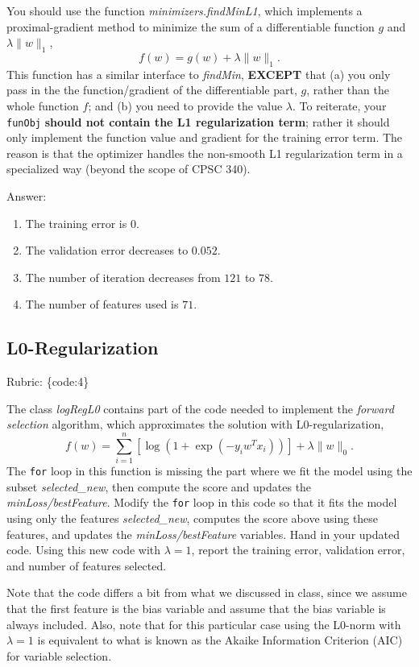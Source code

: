 \documentclass{article}
\def\rubric#1{\gre{Rubric: \{#1\}}}{}
\def\blu#1{{\color{blu}#1}}
\def\gre#1{{\color{gre}#1}}
\def\norm#1{\|#1\|}
\begin{document}
You should use the function \emph{minimizers.findMinL1}, which implements a
proximal-gradient method to minimize the sum of a differentiable function $g$ and $\lambda\norm{w}_1$,
\[
f(w) = g(w) + \lambda \norm{w}_1.
\]
This function has a similar interface to \emph{findMin}, \textbf{EXCEPT} that (a) you
only pass in the the function/gradient of the differentiable
part, $g$, rather than the whole function $f$; and (b) you need to provide the value $\lambda$.
To reiterate, your \texttt{funObj} \textbf{should not contain the L1 regularization term}; rather it
should only implement the function value and gradient for the training error term. The reason is that
the optimizer handles the non-smooth L1 regularization term in a specialized way (beyond the scope of CPSC 340).

\gre{Answer:
\begin{enumerate}
    \item The training error is $0$.
    \item The validation error decreases to $0.052$.
    \item The number of iteration decreases from $121$ to $78$.
    \item The number of features used is $71$.
\end{enumerate}
}


\subsection{L0-Regularization}
\rubric{code:4}

The class \emph{logRegL0} contains part of the code needed to implement the \emph{forward selection} algorithm,
which approximates the solution with L0-regularization,
\[
f(w) =  \sum_{i=1}^n \left[\log(1+\exp(-y_iw^Tx_i))\right] + \lambda\norm{w}_0.
\]
The \texttt{for} loop in this function is missing the part where we fit the model using the subset \emph{selected\_new},
then compute the score and updates the \emph{minLoss/bestFeature}.
Modify the \texttt{for} loop in this code so that it fits the model using only
the features \emph{selected\_new}, computes the score above using these features,
and updates the \emph{minLoss/bestFeature} variables.
\blu{Hand in your updated code. Using this new code with $\lambda=1$,
report the training error, validation error, and number of features selected.}

Note that the code differs a bit from what we discussed in class,
since we assume that the first feature is the bias variable and assume that the
bias variable is always included. Also, note that for this particular case using
the L0-norm with $\lambda=1$ is equivalent to what is known as the Akaike
Information Criterion (AIC) for variable selection.
\end{document}
